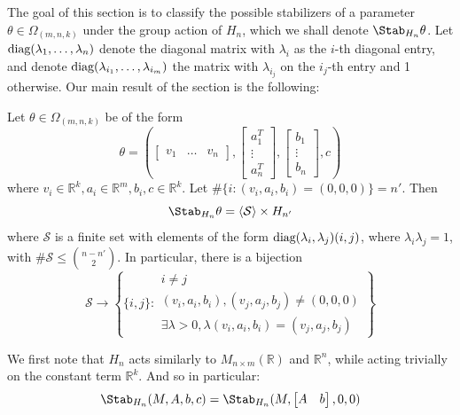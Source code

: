 \documentclass[11pt,letterpaper]{amsart}
\begin{document}
\par The goal of this section is to classify the possible stabilizers of a parameter $\theta\in \Omega_{(m, n, k)}$ under the group action of $H_n$, which we shall denote $\Stab_{H_n}\theta$. Let $\textup{diag}(\lambda_1, \ldots, \lambda_n)$ denote the diagonal matrix with $\lambda_i$ as the $i$-th diagonal entry, and denote $\textup{diag}(\lambda_{i_1}, \ldots, \lambda_{i_m})$ the matrix with $\lambda_{i_j}$ on the $i_j$-th entry and 1 otherwise. Our main result of the section is the following:
\begin{proposition}\label{thm:stabtheoremmnk}
    Let $\theta\in \Omega_{(m, n, k)}$ be of the form
    $$
    \theta = \left(\begin{bmatrix}
        v_1 & \ldots & v_n
    \end{bmatrix}, \begin{bmatrix}
        a_1^T \\ \vdots \\ a_n^T
    \end{bmatrix}, \begin{bmatrix}
        b_1 \\ \vdots \\ b_n
    \end{bmatrix}, c\right)
    $$
    where $v_i\in\mathbb{R}^{k}, a_i\in\mathbb{R}^m, b_i, c\in\mathbb{R}^k$. Let $\#\{i: (v_i, a_i, b_i)= (0, 0, 0)\}=n'$. Then 
    $$
    \Stab_{H_n} \theta = \langle \mathcal{S}\rangle \times H_{n'}
    $$
    where $\mathcal{S}$ is a finite set with elements of the form $\textup{diag}(\lambda_i, \lambda_j) (i, j)$, where $\lambda_i\lambda_j=1$, with $\#\mathcal{S} \leq \binom{n-n'}{2}$. In particular, there is a bijection
    $$
    \mathcal{S}\longrightarrow \left\{\{i, j\}: \begin{split}
        i\neq j\\ (v_i, a_i, b_i), (v_j, a_j, b_j)\neq (0,0, 0)\\ \exists \lambda>0, \lambda (v_i, a_i, b_i)=(v_j, a_j, b_j)
    \end{split}\right\}
    $$
\end{proposition}
We first note that $H_n$ acts similarly to $M_{n\times m}(\mathbb{R})$ and $\mathbb{R}^{n}$, while acting trivially on the constant term $\mathbb{R}^{k}$. And so in particular:
\begin{equation}
    \Stab_{H_n}(M, A, b, c) = \Stab_{H_n}(M, \begin{bmatrix}
        A & b \end{bmatrix}, 0, 0)
\end{equation}
\end{document}
